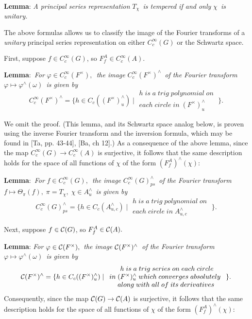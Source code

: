 {\bf Lemma}: {\em A principal series representation }$T_\chi ${\em \ is
tempered if and only }$\chi ${\em \ is unitary.}

The above formulas allows us to classify the image of the Fourier transforms
of a {\em unitary} principal series representation on either $C_c^\infty (G)$
or the Schwartz space.

First, suppose $f\in C_c^\infty (G)$, so $F_f^A\in C_c^\infty (A).$

{\bf Lemma}:{\em \ For }$\varphi \in C_c^\infty (F^{\times }),${\em \ the
image }$C_c^\infty (F^{\times })^{\wedge }${\em \ of the Fourier transform }$%
\varphi \longmapsto \varphi ^{\wedge }(\omega )${\em \ is given by} 
\[
C_c^\infty (F^{\times })^{\wedge }=\{h\in C_c((F^{\times })_u^{\wedge
})\;|\; 
\begin{array}{c}
h\;is\;a\;trig\;polynomial\;on \\ 
each\;circle\;in\;(F^{\times })_u^{\wedge }
\end{array}
\;\}. 
\]

We omit the proof. (This lemma, and its Schwartz space analog below, is
proven using the inverse Fourier transform and the inversion formula, which
may be found in [Ta, pp. 43-44], [Ba, ch 12].) As a consequence of the above
lemma, since the map $C_c^\infty (G)\rightarrow C_c^\infty (A)$ is
surjective, it follows that the same description holds for the space of all
functions of $\chi $ of the form $(F_f^A)^{\wedge }(\chi ):$

{\bf Lemma}:{\em \ For }$f\in C_c^\infty (G),${\em \ the image }$C_c^\infty
(G)_{ps}^{\wedge }${\em \ of the Fourier transform }$f\longmapsto \Theta
_\pi (f),\;\pi =T_\chi ,\;\chi \in A_u^{\wedge }${\em \ is given by} 
\[
C_c^\infty (G)_{ps}^{\wedge }=\{h\in C_c(A_{u,c}^{\wedge })\;|\; 
\begin{array}{c}
h\;is\;a\;trig\;polynomial\;on \\ 
each\;circle\;in\;A_{u,c}^{\wedge }
\end{array}
\;\}. 
\]

Next, suppose $f\in {\cal C}(G)$, so $F_f^A\in {\cal C}(A).$

{\bf Lemma}: {\em For }$\varphi \in {\cal C}(F^{\times }),${\em \ the image }%
${\cal C}(F^{\times })^{\wedge }${\em \ of the Fourier transform }$\varphi
\longmapsto \varphi ^{\wedge }(\omega )${\em \ is given by} 
\[
{\cal C}(F^{\times })^{\wedge }=\{h\in C_c((F^{\times })_u^{\wedge })\;|\; 
\begin{array}{c}
\;h\;is\;a\;trig\;series\;on\;each\;circle \\ 
in\;(F^{\times })_u^{\wedge }\;which\;converges\;absolutely\; \\ 
along\;with\;all\;of\;its\;derivatives
\end{array}
\}. 
\]
Consequently, since the map ${\cal C}(G)\rightarrow {\cal C}(A)$ is
surjective, it follows that the same description holds for the space of all
functions of $\chi $ of the form $(F_f^A)^{\wedge }(\chi ):$

